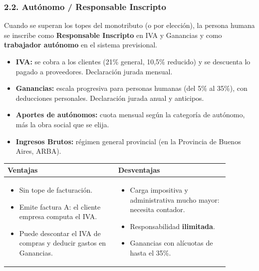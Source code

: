 \subsubsection*{2.2. Autónomo / Responsable Inscripto}
Cuando se superan los topes del monotributo (o por elección), la persona humana se inscribe
como \textbf{Responsable Inscripto} en IVA y Ganancias y como \textbf{trabajador autónomo} en
el sistema previsional.
\begin{itemize}
  \item \textbf{IVA:} se cobra a los clientes (21\% general, 10,5\% reducido) y se descuenta lo
        pagado a proveedores. Declaración jurada mensual.
  \item \textbf{Ganancias:} escala progresiva para personas humanas (del 5\% al 35\%), con
        deducciones personales. Declaración jurada anual y anticipos.
  \item \textbf{Aportes de autónomos:} cuota mensual según la categoría de autónomo, más la
        obra social que se elija.
  \item \textbf{Ingresos Brutos:} régimen general provincial (en la Provincia de Buenos Aires,
        ARBA).
\end{itemize}

\begin{center}
\small
\begin{tabular}{|p{0.44\linewidth}|p{0.44\linewidth}|}
\hline
\textbf{Ventajas} & \textbf{Desventajas} \\ \hline
\begin{itemize}[leftmargin=*,nosep]
  \item Sin tope de facturación.
  \item Emite factura A: el cliente empresa computa el IVA.
  \item Puede descontar el IVA de compras y deducir gastos en Ganancias.
\end{itemize}
&
\begin{itemize}[leftmargin=*,nosep]
  \item Carga impositiva y administrativa mucho mayor: necesita contador.
  \item Responsabilidad \textbf{ilimitada}.
  \item Ganancias con alícuotas de hasta el 35\%.
\end{itemize}
\\ \hline
\end{tabular}
\end{center}

